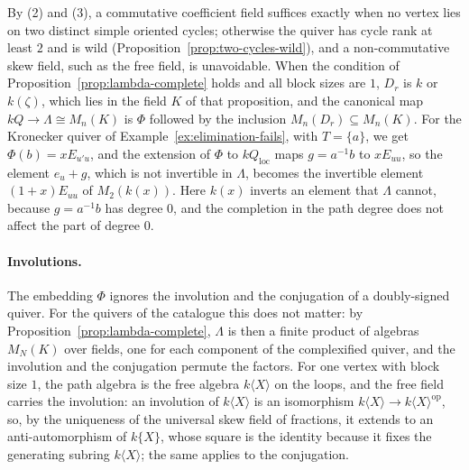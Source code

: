\documentclass[12pt, a4paper]{report}
\theoremstyle{plain}
\theoremstyle{definition}
\theoremstyle{remark}
\theoremstyle{plain}
\begin{document}
By (2) and (3), a commutative coefficient field suffices exactly when no vertex lies on two distinct simple oriented cycles; otherwise the quiver has cycle rank at least $2$ and is wild (Proposition~\ref{prop:two-cycles-wild}), and a non-commutative skew field, such as the free field, is unavoidable. When the condition of Proposition~\ref{prop:lambda-complete} holds and all block sizes are $1$, $D_r$ is $k$ or $k(\zeta)$, which lies in the field $K$ of that proposition, and the canonical map $kQ\to\Lambda\cong M_n(K)$ is $\Phi$ followed by the inclusion $M_n(D_r)\subseteq M_n(K)$. For the Kronecker quiver of Example~\ref{ex:elimination-fails}, with $T=\{a\}$, we get $\Phi(b)=xE_{u'u}$, and the extension of $\Phi$ to $kQ_{\mathrm{loc}}$ maps $g=a^{-1}b$ to $xE_{uu}$, so the element $e_u+g$, which is not invertible in $\Lambda$, becomes the invertible element $(1+x)E_{uu}$ of $M_2(k(x))$. Here $k(x)$ inverts an element that $\Lambda$ cannot, because $g=a^{-1}b$ has degree $0$, and the completion in the path degree does not affect the part of degree $0$.

\paragraph{Involutions.} The embedding $\Phi$ ignores the involution and the conjugation of a doubly-signed quiver. For the quivers of the catalogue this does not matter: by Proposition~\ref{prop:lambda-complete}, $\Lambda$ is then a finite product of algebras $M_N(K)$ over fields, one for each component of the complexified quiver, and the involution and the conjugation permute the factors. For one vertex with block size $1$, the path algebra is the free algebra $k\langle X\rangle$ on the loops, and the free field carries the involution: an involution of $k\langle X\rangle$ is an isomorphism $k\langle X\rangle\to k\langle X\rangle^{\mathrm{op}}$, so, by the uniqueness of the universal skew field of fractions, it extends to an anti-automorphism of $k\{X\}$, whose square is the identity because it fixes the generating subring $k\langle X\rangle$; the same applies to the conjugation.
\end{document}
